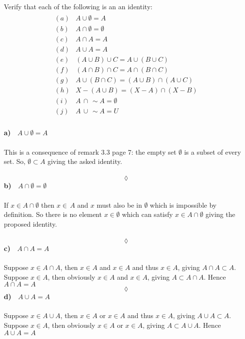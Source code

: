 \subsection{}
\begin{tcolorbox}
Verify that each of the following is an an identity:
\begin{align*}
\begin{array}{ll}
(a)&A\cup \emptyset = A\\
(b)& A\cap \emptyset = \emptyset\\
(c) &A \cap A = A\\
(d) &A \cup A =A\\
(e)&(A\cup B)\cup C= A\cup(B\cup C) \\
(f)& (A\cap B)\cap C= A\cap(B\cap C)\\
(g) &A\cup (B\cap C)= (A\cup B)\cap (A\cup C)\\
(h) &X-(A\cup B) = (X-A)\cap (X-B)\\
(i)&A\, \cap \, \sim A = \emptyset\\
(j)& A\, \cup \, \sim A = U\\
\end{array}
\end{align*}
\end{tcolorbox}
\textbf{a)}$\quad A\cup \emptyset = A $\\\\
This is a consequence of remark 3.3 page 7: the empty set $\emptyset$ is a subset of every set. So, $\emptyset\subset A$ giving the asked identity. \\\\
$$\lozenge$$
\textbf{b)}$\quad A\cap \emptyset = \emptyset$\\\\
If $x\in A\cap \emptyset$ then $x\in \, A$ and $x$ must also be in $\emptyset$ which is impossible by definition. So there is no element $x \in \emptyset$ which can satisfy $x\in A\cap \emptyset$ giving the proposed identity. \\\\
$$\lozenge$$
\textbf{c)}$\quad A \cap A =A$\\\\
 Suppose $x \in A\cap A$, then $x \in A$ and $x\in A$ and thus $x\in A$, giving  $ A \cap A \subset A$. Suppose $x \in A$, then obviously  $x \in A$ and $x \in A$, giving $A\subset A\cap A$. Hence $A \cap A =A$
$$\lozenge$$
\textbf{d)}$\quad A \cup A =A$\\\\
Suppose $x \in A\cup A$, then $x \in A$ or $x\in A$ and thus $x\in A$, giving  $ A \cup A \subset A$. Suppose $x \in A$, then obviously  $x \in A$ or $x \in A$, giving $A\subset A\cup A$. Hence $A \cup A =A$
